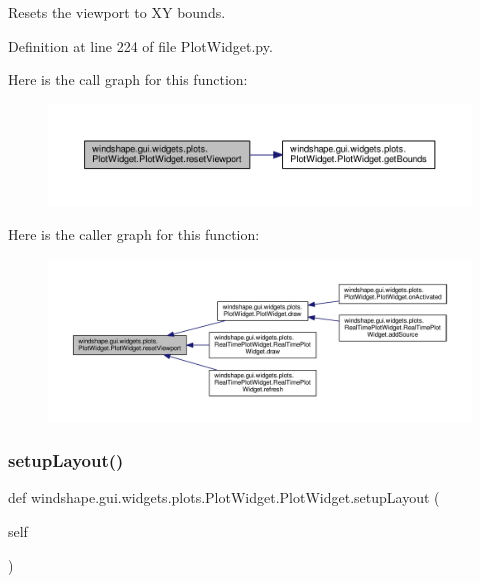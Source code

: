 \begin{DoxyVerb}Resets the viewport to XY bounds.\end{DoxyVerb}
 

Definition at line 224 of file Plot\+Widget.\+py.

Here is the call graph for this function\+:\nopagebreak
\begin{figure}[H]
\begin{center}
\leavevmode
\includegraphics[width=350pt]{classwindshape_1_1gui_1_1widgets_1_1plots_1_1_plot_widget_1_1_plot_widget_afa4ffce30d37b17607e1f5acba0e357e_cgraph}
\end{center}
\end{figure}
Here is the caller graph for this function\+:\nopagebreak
\begin{figure}[H]
\begin{center}
\leavevmode
\includegraphics[width=350pt]{classwindshape_1_1gui_1_1widgets_1_1plots_1_1_plot_widget_1_1_plot_widget_afa4ffce30d37b17607e1f5acba0e357e_icgraph}
\end{center}
\end{figure}
\mbox{\label{classwindshape_1_1gui_1_1widgets_1_1plots_1_1_plot_widget_1_1_plot_widget_a8b06aa1c5c5ed45d893a7b0674387759}} 
\subsubsection{\texorpdfstring{setup\+Layout()}{setupLayout()}}
{\footnotesize\ttfamily def windshape.\+gui.\+widgets.\+plots.\+Plot\+Widget.\+Plot\+Widget.\+setup\+Layout (\begin{DoxyParamCaption}\item[{}]{self }\end{DoxyParamCaption})}

